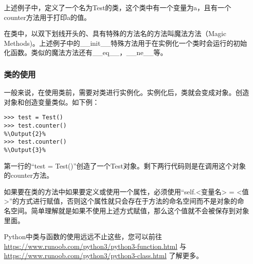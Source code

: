 上述例子中，定义了一个名为Test的类，这个类中有一个变量为a，且有一个counter方法用于打印a的值。
\begin{ExtraKnowledge}
    在类中，以双下划线开头的、具有特殊的方法名的方法叫魔法方法（Magic Methods)。上述例子中的\_\_init\_\_特殊方法用于在实例化一个类时会运行的初始化函数。类似的魔法方法还有\_\_eq\_\_，\_\_ne\_\_等。
\end{ExtraKnowledge}

\subsubsection{类的使用}
一般来说，在使用类前，需要对类进行实例化。实例化后，类就会变成对象。创造对象和创造变量类似。如下例：

\begin{lstlisting}
>>> test = Test()
>>> test.counter()
%\Output{2}%
>>> test.counter()
%\Output{3}%
\end{lstlisting}

第一行的“test = Test()”创造了一个Test对象。剩下两行代码则是在调用这个对象的counter方法。

如果要在类的方法中如果要定义或使用一个属性，必须使用“self.<变量名> = <值>”的方式进行赋值，否则这个属性就只会存在于方法的命名空间而不是对象的命名空间。简单理解就是如果不使用上述方式赋值，那么这个值就不会被保存到对象里面。

\begin{ExtraKnowledge}
    Python中类与函数的使用远远不止这些，您可以前往 \url{https://www.runoob.com/python3/python3-function.html} 与 \url{https://www.runoob.com/python3/python3-class.html} 了解更多。
\end{ExtraKnowledge}

